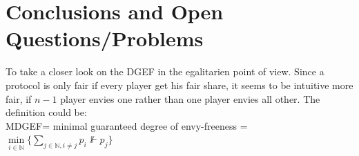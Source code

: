 \section{Conclusions and Open Questions/Problems}
To take a closer look on the DGEF in the egalitarien point of view. Since a protocol is only fair if every player get his fair share, it seems to be intuitive more fair, if $n-1$ player envies one rather than one player envies all other. The definition could be:\\
MDGEF= minimal guaranteed degree of envy-freeness = $\min\limits_{i\in \mathbb{N}}\{\sum\limits_{j\in\mathbb{N},i \neq j} p_i \nVdash p_j\}$
 
\pagebreak


\clearpage




\clearpage

\listoffigures

\listoftables


